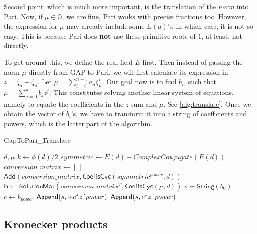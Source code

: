 \documentclass[11pt]{article}
\begin{document}
Second point, which is much more important, is the translation of the \textit{norm}
into Pari. Now, if $\mu \in \mathbb{Q}$, we are fine, Pari works with precise
fractions too. However, the expression for $\mu$ may already include some
$\text{E}(a)$'s, in which case, it is not so easy. This is because Pari does
\textbf{not} use these primitive roots of $1$, at least, not directly.

To get around this, we define the real field $E$ first. Then instead of passing the
norm $\mu$ directly from GAP to Pari, we will first calculate its expression in
$z = \zeta_n + \overline{\zeta_n}$. Let $\mu = \sum_{i = 0}^{n-1} a_n \zeta_n^i$.
Our goal now is to find $b_i$, such that $\mu = \sum_{j = 0}^{k} b_j z^j$.
This constitutes solving another linear system of equations, namely to equate the
coefficients in the $z$-sum and $\mu$. See \cref{alg:translate}. Once we obtain
the vector of $b_i$'s, we have to transform it into a string of coefficients and
powers, which is the latter part of the algorithm.

\begin{algorithm}
  \caption{GapToPari\_Translate}
  \label{alg:translate}
  \begin{algorithmic}
    \State $d, \mu$
    \State $k \gets \phi(d) / 2$ 
    \State $symmetric \gets E(d) + ComplexConjugate(E(d))$
    \State $conversion\_matrix \gets [~]$
      \State $\textsf{Add}(conversion\_matrix, \textsf{CoeffsCyc}(symmetric^{power}, d))$
    \EndFor
    \State $\mathbf{b} \gets \textsf{SolutionMat}(conversion\_matrix^T, \textsf{CoeffsCyc}(\mu, d))$
    \State $s = \textsf{String}(b_0)$
      \State $c \gets b_{power}$
        \State $\textsf{Append}(s, +c^*z \string^ power)$
        \State $\textsf{Append}(s, c^*z \string^ power)$ 
      \EndIf
    \EndFor
  \end{algorithmic}
\end{algorithm}

\subsection{Kronecker products} \label{sec:kronecker}
\end{document}
